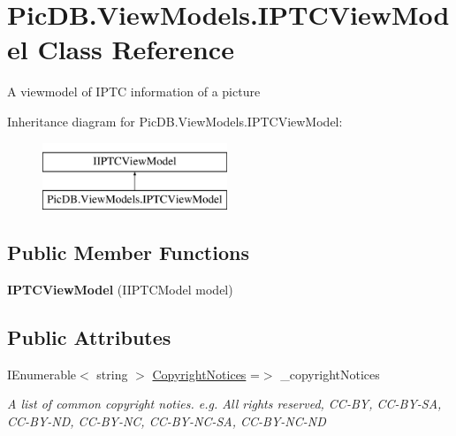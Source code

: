 \hypertarget{class_pic_d_b_1_1_view_models_1_1_i_p_t_c_view_model}{}\section{Pic\+D\+B.\+View\+Models.\+I\+P\+T\+C\+View\+Model Class Reference}
\label{class_pic_d_b_1_1_view_models_1_1_i_p_t_c_view_model}


A viewmodel of I\+P\+TC information of a picture  


Inheritance diagram for Pic\+D\+B.\+View\+Models.\+I\+P\+T\+C\+View\+Model\+:\begin{figure}[H]
\begin{center}
\leavevmode
\includegraphics[height=2.000000cm]{class_pic_d_b_1_1_view_models_1_1_i_p_t_c_view_model}
\end{center}
\end{figure}
\subsection*{Public Member Functions}
\begin{DoxyCompactItemize}
\item 
\mbox{\label{class_pic_d_b_1_1_view_models_1_1_i_p_t_c_view_model_a78d3aa2f6a067518ae5f5675433b90a9}} 
{\bfseries I\+P\+T\+C\+View\+Model} (I\+I\+P\+T\+C\+Model model)
\end{DoxyCompactItemize}
\subsection*{Public Attributes}
\begin{DoxyCompactItemize}
\item 
I\+Enumerable$<$ string $>$ \mbox{\hyperlink{class_pic_d_b_1_1_view_models_1_1_i_p_t_c_view_model_adce53c4d69fca3cb1fd53a3fabd28d0d}{Copyright\+Notices}} =$>$ \+\_\+copyright\+Notices
\begin{DoxyCompactList}\small\item\em A list of common copyright noties. e.\+g. All rights reserved, C\+C-\/\+BY, C\+C-\/\+B\+Y-\/\+SA, C\+C-\/\+B\+Y-\/\+ND, C\+C-\/\+B\+Y-\/\+NC, C\+C-\/\+B\+Y-\/\+N\+C-\/\+SA, C\+C-\/\+B\+Y-\/\+N\+C-\/\+ND \end{DoxyCompactList}\end{DoxyCompactItemize}
